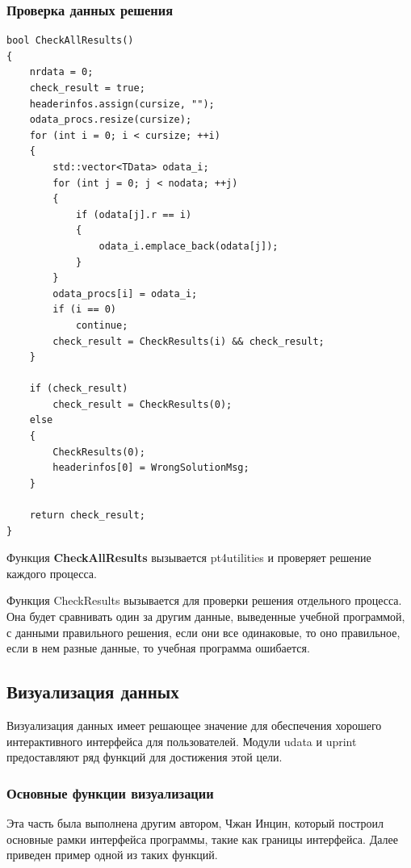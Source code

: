 \subsubsection{Проверка данных решения}
\lstset{language=c++}
\begin{lstlisting}
bool CheckAllResults()
{
    nrdata = 0;
    check_result = true;
    headerinfos.assign(cursize, "");
    odata_procs.resize(cursize);
    for (int i = 0; i < cursize; ++i)
    {
        std::vector<TData> odata_i;
        for (int j = 0; j < nodata; ++j)
        {
            if (odata[j].r == i)
            {
                odata_i.emplace_back(odata[j]);
            }
        }
        odata_procs[i] = odata_i;
        if (i == 0)
            continue;
        check_result = CheckResults(i) && check_result;
    }

    if (check_result)
        check_result = CheckResults(0);
    else
    {
        CheckResults(0);
        headerinfos[0] = WrongSolutionMsg;
    }

    return check_result;
}
\end{lstlisting}
Функция \textbf{CheckAllResults} вызывается pt4utilities и проверяет решение каждого процесса.

Функция CheckResults вызывается для проверки решения отдельного процесса. Она будет сравнивать один за другим данные, выведенные учебной программой, с данными правильного решения, если они все одинаковые, то оно правильное, если в нем разные данные, то учебная программа ошибается.

\subsection{Визуализация данных}
Визуализация данных имеет решающее значение для обеспечения хорошего интерактивного интерфейса для пользователей. Модули udata и uprint предоставляют ряд функций для достижения этой цели.

\subsubsection{Основные функции визуализации}
Эта часть была выполнена другим автором, Чжан Инцин, который построил основные рамки интерфейса программы, такие как границы интерфейса.
Далее приведен пример одной из таких функций.

